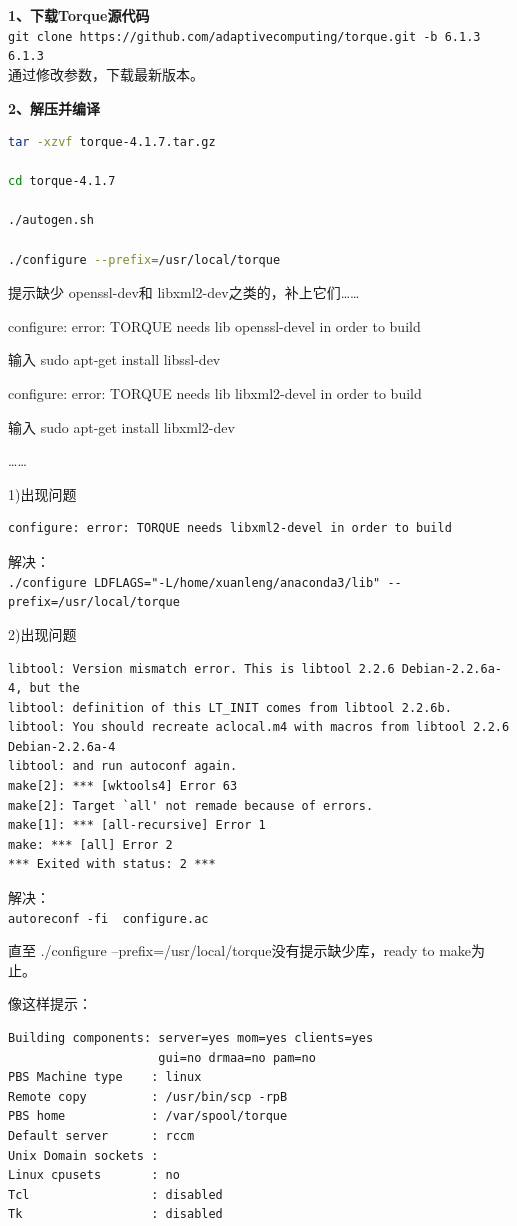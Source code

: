 {\textbf{1、下载Torque源代码}\\
\verb|git clone https://github.com/adaptivecomputing/torque.git -b 6.1.3 6.1.3|\\
通过修改参数，下载最新版本。

\textbf{2、解压并编译}

\begin{lstlisting}[language=sh]
tar -xzvf torque-4.1.7.tar.gz

cd torque-4.1.7

./autogen.sh

./configure --prefix=/usr/local/torque
\end{lstlisting}

提示缺少 openssl-dev和 libxml2-dev之类的，补上它们……

configure: error: TORQUE needs lib openssl-devel in order to build

输入 sudo apt-get install libssl-dev

configure: error: TORQUE needs lib libxml2-devel in order to build

输入 sudo apt-get install libxml2-dev

……

1)出现问题
\begin{verbatim}
configure: error: TORQUE needs libxml2-devel in order to build
\end{verbatim}

解决：\\
\verb|./configure LDFLAGS="-L/home/xuanleng/anaconda3/lib" --prefix=/usr/local/torque|

2)出现问题
\begin{verbatim}
libtool: Version mismatch error. This is libtool 2.2.6 Debian-2.2.6a-4, but the
libtool: definition of this LT_INIT comes from libtool 2.2.6b.
libtool: You should recreate aclocal.m4 with macros from libtool 2.2.6 Debian-2.2.6a-4
libtool: and run autoconf again.
make[2]: *** [wktools4] Error 63
make[2]: Target `all' not remade because of errors.
make[1]: *** [all-recursive] Error 1
make: *** [all] Error 2
*** Exited with status: 2 ***
\end{verbatim}
解决：\\
\verb|autoreconf -fi  configure.ac |



直至 ./configure --prefix=/usr/local/torque没有提示缺少库，ready to make为止。

像这样提示：
\begin{verbatim}
Building components: server=yes mom=yes clients=yes
                     gui=no drmaa=no pam=no
PBS Machine type    : linux
Remote copy         : /usr/bin/scp -rpB
PBS home            : /var/spool/torque
Default server      : rccm
Unix Domain sockets :
Linux cpusets       : no
Tcl                 : disabled
Tk                  : disabled
\end{verbatim}

}
